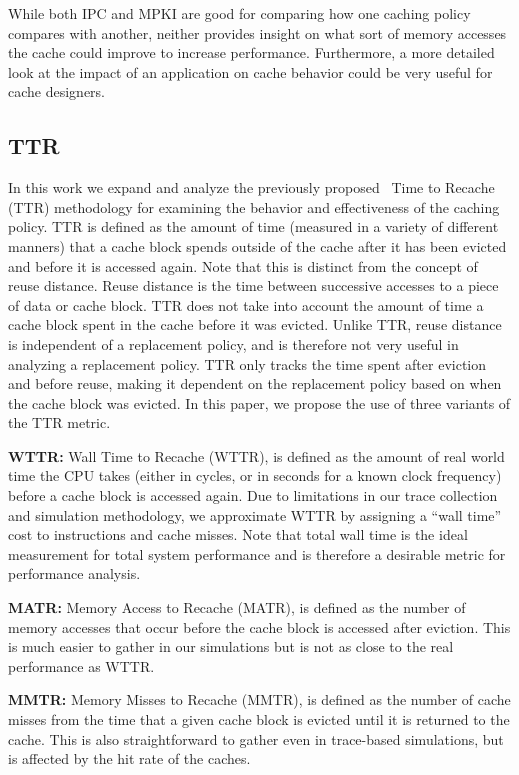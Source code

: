 While both IPC and MPKI are good for comparing how one caching policy compares with another,
	neither provides insight on what sort of memory accesses the cache could improve to increase performance.
Furthermore, a more detailed look at the impact of an application on cache behavior could be very useful for cache designers.

\subsection{TTR}
\label{sec:metrics}
In this work we expand and analyze the previously proposed~\cite{spjutpugsley17} Time to Recache (TTR) methodology for examining the behavior and effectiveness of the caching policy.
TTR is defined as the amount of time (measured in a variety of different manners) that a cache block spends outside of the cache after it has been evicted and before it is accessed again.
Note that this is distinct from the concept of reuse distance. 
Reuse distance is the time between successive accesses to a piece of data or cache block. 
TTR does not take into account the amount of time a cache block spent in the cache before it was evicted.
Unlike TTR, reuse distance is independent of a replacement policy, and is therefore not very useful in analyzing a replacement policy.
TTR only tracks the time spent after eviction and before reuse, making it dependent on the replacement policy based on when the cache block was evicted.
In this paper, we propose the use of three variants of the TTR metric. 

\textbf{WTTR:}
Wall Time to Recache (WTTR), is defined as the amount of real world time the CPU takes (either in cycles, or in seconds for a known clock frequency) before a cache block is accessed again.
Due to limitations in our trace collection and simulation methodology, we approximate WTTR by assigning a ``wall time'' cost to instructions and cache misses.
Note that total wall time is the ideal measurement for total system performance and is therefore a desirable metric for performance analysis.

\textbf{MATR:}
Memory Access to Recache (MATR), is defined as the number of memory accesses that occur before the cache block is accessed after eviction.
This is much easier to gather in our simulations but is not as close to the real performance as WTTR.

\textbf{MMTR:}
Memory Misses to Recache (MMTR), is defined as the number of cache misses from the time that a given cache block is evicted until it is returned to the cache.
This is also straightforward to gather even in trace-based simulations, but is affected by the hit rate of the caches.

